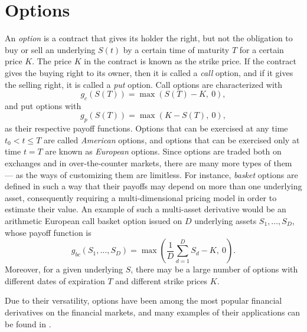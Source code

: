 \documentclass{UUThesisTemplate}
\begin{document}
\section{Options}
\label{sec:options}
\par An \emph{option} is a contract that gives its holder the right, but not the obligation to buy or sell an underlying $S(t)$ by a certain time of maturity $T$ for a certain price $K$. The price $K$ in the contract is known as the strike price. If the contract gives the buying right to its owner, then it is called a \emph{call} option, and if it gives the selling right, it is called a \emph{put} option. Call options are characterized with 
$$g_c(S(T))=\max(S(T)-K,\ 0),$$
and put options with 
$$g_p(S(T))=\max(K-S(T),\ 0),$$
as their respective payoff functions. Options that can be exercised at any time $t_0 < t \leq T$ are called \emph{American} options, and options that can be exercised only at time $t=T$ are known as \emph{European} options. Since options are traded both on exchanges and in over-the-counter markets, there are many more types of them --- as the ways of customizing them are limitless. For instance, \emph{basket} options are defined in such a way that their payoffs may depend on more than one underlying asset, consequently requiring a multi-dimensional pricing model in order to estimate their value. An example of such a multi-asset derivative would be an arithmetic European call basket option issued on $D$ underlying assets $S_1,\ldots,S_D$, whose payoff function is 
$$g_{bc}(S_1,\ldots,S_D) = \max\left(\frac{1}{D}\sum_{d=1}^D S_d - K,\ 0\right).$$
Moreover, for a given underlying $S$, there may be a large number of options with different dates of expiration $T$ and different strike prices $K$. 
\par Due to their versatility, options have been among the most popular financial derivatives on the financial markets, and many examples of their applications can be found in \cite{hull2017options}.
%
%
\end{document}
